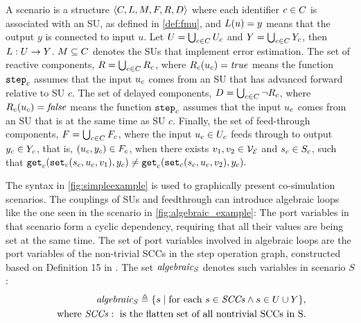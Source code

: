 \begin{definition}[Scenario]\label{def:cosim_scenario}
  A scenario is a structure $ \left\langle C, L, M, F, R, D \right\rangle $ where each identifier $c \in C$ is associated with an SU, as defined in \cref{def:fmu}, and $L(u)=y$ means that the output $y$ is connected to input $u$.
  Let $U = \bigcup_{c \in C} U_{c}$ and $Y = \bigcup_{c \in C} Y_{c}$, then $L : U \to Y$. 
  $M \subseteq C$ denotes the SUs that implement error estimation. 
  The set of reactive components,
  $R = \bigcup_{c \in C} R_{c}$, where $R_{c}(u_{c}) = \mathit{true}$ means the function $\mathtt{step}_{c}$ assumes that the input $u_{c}$ comes from an SU that has advanced forward relative to SU $c$.  
The set of delayed components,
  $D = \bigcup_{c \in C} \neg R_{c}$, where $R_{c}(u_{c}) = \mathit{false}$ means the function $\mathtt{step}_{c}$ assumes that the input $u_{c}$ comes from an SU that is at the same time as SU $c$. 
 Finally, the set of feed-through components, $F = \bigcup_{c \in C} F_{c}$, where the input $u_{c} \in U_{c}$ feeds through to output $y_{c} \in Y_{c}$, that is, $(u_{c},y_{c}) \in F_{c}$, when there exists $v_1, v_2 \in \mathcal{V_{E}}$ and $s_{c} \in S_{c}$, such that
  $\mathtt{get}_{c} (\mathtt{set}_{c}(s_{c}, u_{c}, v_1), y_{c}) \neq \mathtt{get}_{c} (\mathtt{set}_{c}(s_{c}, u_{c}, v_2), y_{c}).$
\end{definition}  

The syntax in \cref{fig:simpleexample} is used to graphically present co-simulation scenarios.
The couplings of SUs and feedthrough can introduce algebraic loops like the one seen in the scenario in \cref{fig:algebraic_example}: The port variables in that scenario form a cyclic dependency, requiring that all their values are being set at the same time. The set of port variables involved in algebraic loops are the port variables of the non-trivial SCCs in the step operation graph, constructed based on Definition 15 in \cite{Gomes2019c}.
The set $\mathit{algebraic_{S}}$ denotes such variables in scenario $S$:
\begin{align*}
  \mathit{algebraic_{S}} \triangleq \{s \mid \text{for each\ } s \in \mathit{SCCs} \land s \in U \cup Y\}, \\
  \text{ where } \mathit{SCCs}: \text{ is the flatten set of all nontrivial SCCs in S}.
\end{align*}
\vspace{-0.5em}

